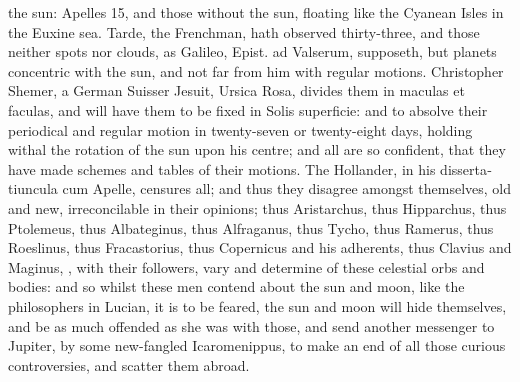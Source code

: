 {the sun: Apelles 15, and those without the sun, floating like the
Cyanean Isles in the Euxine sea. Tarde, the Frenchman, hath
observed thirty-three, and those neither spots nor clouds, as Galileo,
Epist. ad Valserum, supposeth, but planets concentric with the sun, and
not far from him with regular motions. Christopher Shemer, a
German Suisser Jesuit, Ursica Rosa, divides them in maculas et faculas,
and will have them to be fixed in Solis superficie: and to absolve
their periodical and regular motion in twenty-seven or twenty-eight
days, holding withal the rotation of the sun upon his centre; and all
are so confident, that they have made schemes and tables of their
motions. The Hollander, in his \textlatin{dissertatiuncula cum Apelle},
censures all; and thus they disagree amongst themselves, old and new,
irreconcilable in their opinions; thus Aristarchus, thus Hipparchus,
thus Ptolemeus, thus Albateginus, thus Alfraganus, thus Tycho, thus
Ramerus, thus Roeslinus, thus Fracastorius, thus Copernicus and his
adherents, thus Clavius and Maginus, \etc{}, with their followers, vary
and determine of these celestial orbs and bodies: and so whilst these
men contend about the sun and moon, like the philosophers in Lucian, it
is to be feared, the sun and moon will hide themselves, and be as much
offended as she was with those, and send another messenger to
Jupiter, by some new-fangled Icaromenippus, to make an end of all those
curious controversies, and scatter them abroad.

}
